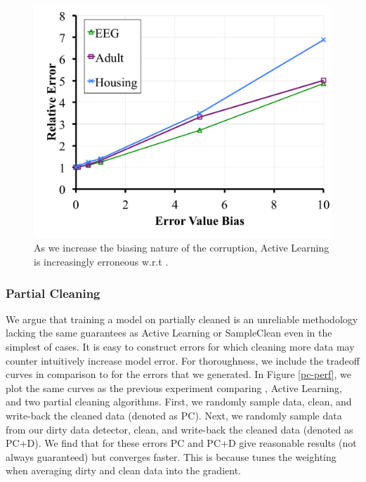 \begin{figure}[ht!]
\centering
 \includegraphics[width=0.6\columnwidth]{exp/exp10.pdf}
 \caption{As we increase the biasing nature of the corruption, Active Learning is increasingly erroneous w.r.t \sys. \label{albias}}
\end{figure}
\fi

\subsubsection{Partial Cleaning}
We argue that training a model on partially cleaned is an unreliable methodology lacking the same guarantees as Active Learning or SampleClean even in the simplest of cases.
It is easy to construct errors for which cleaning more data may counter intuitively increase model error.
For thoroughness, we include the tradeoff curves in comparison to \sys for the errors that we generated.
In Figure \ref{pc-perf}, we plot the same curves as the previous experiment comparing \sys, Active Learning, and two partial cleaning algorithms.
First, we randomly sample data, clean, and write-back the cleaned data (denoted as PC).
Next, we randomly sample data from our dirty data detector, clean, and write-back the cleaned data (denoted as PC+D).
We find that for these errors PC and PC+D give reasonable results (not always guaranteed) but \sys converges faster.
This is because \sys tunes the weighting when averaging dirty and clean data into the gradient.

